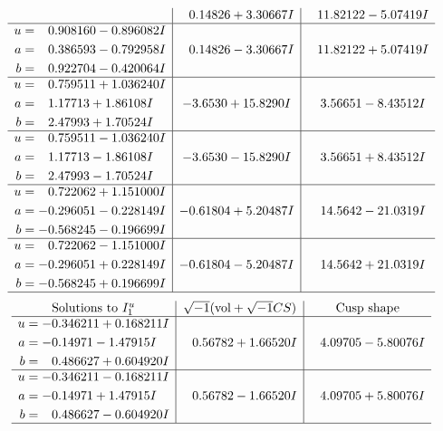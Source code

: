 \documentclass[1p]{elsarticle_modified}
\theoremstyle{definition}
\newcommand{\I}{\sqrt{-1}}
\begin{document}
$$\begin{array}{c|c|c}
 & \phantom{-}0.14826 + 3.30667 I & \phantom{-}11.82122 - 5.07419 I \\ \hline\begin{aligned}
u &= \phantom{-}0.908160 - 0.896082 I \\
a &= \phantom{-}0.386593 - 0.792958 I \\
b &= \phantom{-}0.922704 - 0.420064 I\end{aligned}
 & \phantom{-}0.14826 - 3.30667 I & \phantom{-}11.82122 + 5.07419 I \\ \hline\begin{aligned}
u &= \phantom{-}0.759511 + 1.036240 I \\
a &= \phantom{-}1.17713 + 1.86108 I \\
b &= \phantom{-}2.47993 + 1.70524 I\end{aligned}
 & -3.6530 + 15.8290 I & \phantom{-}3.56651 - 8.43512 I \\ \hline\begin{aligned}
u &= \phantom{-}0.759511 - 1.036240 I \\
a &= \phantom{-}1.17713 - 1.86108 I \\
b &= \phantom{-}2.47993 - 1.70524 I\end{aligned}
 & -3.6530 - 15.8290 I & \phantom{-}3.56651 + 8.43512 I \\ \hline\begin{aligned}
u &= \phantom{-}0.722062 + 1.151000 I \\
a &= -0.296051 - 0.228149 I \\
b &= -0.568245 - 0.196699 I\end{aligned}
 & -0.61804 + 5.20487 I & \phantom{-}14.5642 - 21.0319 I \\ \hline\begin{aligned}
u &= \phantom{-}0.722062 - 1.151000 I \\
a &= -0.296051 + 0.228149 I \\
b &= -0.568245 + 0.196699 I\end{aligned}
 & -0.61804 - 5.20487 I & \phantom{-}14.5642 + 21.0319 I\\
 \hline 
 \end{array}$$\newpage$$\begin{array}{c|c|c}  
\text{Solutions to }I^u_{1}& \I (\text{vol} + \sqrt{-1}CS) & \text{Cusp shape}\\
 \hline 
\begin{aligned}
u &= -0.346211 + 0.168211 I \\
a &= -0.14971 - 1.47915 I \\
b &= \phantom{-}0.486627 + 0.604920 I\end{aligned}
 & \phantom{-}0.56782 + 1.66520 I & \phantom{-}4.09705 - 5.80076 I \\ \hline\begin{aligned}
u &= -0.346211 - 0.168211 I \\
a &= -0.14971 + 1.47915 I \\
b &= \phantom{-}0.486627 - 0.604920 I\end{aligned}
 & \phantom{-}0.56782 - 1.66520 I & \phantom{-}4.09705 + 5.80076 I\\
 \hline 
 \end{array}$$\newpage\newpage\renewcommand{\arraystretch}{1}
\end{document}
